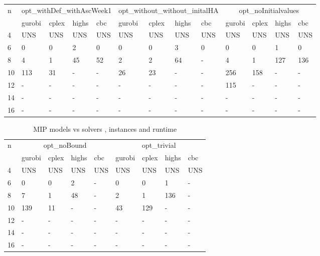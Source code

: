 \documentclass{article}
\begin{document}
\begin{table}[H]
\centering
\begin{tabular}{| p{0.35cm}|p{0.8cm}|p{0.8cm}|p{0.8cm}|p{0.7cm}|p{0.8cm}|p{0.8cm}|p{0.8cm}|p{0.7cm}|p{0.8cm}|p{0.8cm}|p{0.8cm}|p{0.7cm} | }
 \hline
 \multirow{2}{*}{n} & \multicolumn{4}{|c|}{opt\_withDef\_withAscWeek1}& \multicolumn{4}{|c|}{opt\_without\_without\_initalHA}& \multicolumn{4}{|c|}{opt\_noInitialvalues}\\
 \cline{2-13}
  &  gurobi& cplex & highs & cbc& gurobi& cplex & highs & cbc& gurobi& cplex & highs & cbc\\
 \hline
 4&  UNS& UNS& UNS&   UNS&  UNS& UNS& UNS&  UNS&  UNS& UNS& UNS&   UNS\\
 6&   0& 0&  2&  0&  0& 0& 3&  0&  0& 0& 1&       0\\
 8&   4&  1& 45&   52&  2& 2& 64& -&  4& 1& 127&      136\\
 10&  113& 31&  -&   -&  26& 23& -& -&  256& 158& -&   -\\
 12&  -&  -&  -& -&  -& -& -&  -&  115& -& -&     -\\
 14&  -&  -& -&  -&  -& -& -&  -&  -& -& -&   -\\
 16& - & - & - & - & - & -& -& - & - &- &- &-\\

\hline
\end{tabular}
\end{table}
\begin{table}[H]
\centering
\begin{tabular}{| p{0.35cm}|p{0.8cm}|p{0.8cm}|p{0.8cm}|p{0.7cm}|p{0.8cm}|p{0.8cm}|p{0.8cm}|p{0.7cm}| }
 \hline
 \multirow{2}{*}{n} & \multicolumn{4}{|c|}{opt\_noBound}& \multicolumn{4}{|c|}{opt\_trivial}\\
 \cline{2-9}
  &  gurobi& cplex & highs & cbc& gurobi& cplex & highs & cbc\\
 \hline
 4&  UNS& UNS& UNS&   UNS&  UNS& UNS& UNS&  UNS\\
 6&   0& 0&  2&  -&  0& 0& 1&         -\\
 8&   7&  1& 48&   -&  2& 1& 136&       -\\
 10&  139& 11&  -&   -&  43& 129& -&  -\\
 12&  -&  -&  -& -&  -& -& -&       -\\
 14&  -&  -& -&  -&  -& -& -&       -\\
 16& - & - & - & - & - & -& -& - \\

\hline
\end{tabular}

\caption{MIP models vs solvers , instances and runtime }
\label{table:3}
\end{table}
\end{document}
